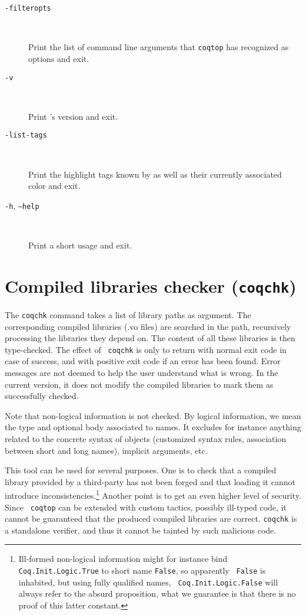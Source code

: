 \begin{description}
\item[{\tt -filteropts}]\ %

  Print the list of command line arguments that {\tt coqtop} has
  recognized as options and exit.

\item[{\tt -v}]\ %

  Print \Coq's version and exit.

\item[{\tt -list-tags}]\ %

  Print the highlight tags known by {\Coq} as well as their currently associated
  color and exit.

\item[{\tt -h}, {\tt --help}]\ %

  Print a short usage and exit.

\end{description}


\section{Compiled libraries checker ({\tt coqchk})}

The {\tt coqchk} command takes a list of library paths as argument.
The corresponding compiled libraries (.vo files) are searched in the
path, recursively processing the libraries they depend on. The content
of all these libraries is then type-checked. The effect of {\tt
  coqchk} is only to return with normal exit code in case of success,
and with positive exit code if an error has been found. Error messages
are not deemed to help the user understand what is wrong. In the
current version, it does not modify the compiled libraries to mark
them as successfully checked.

Note that non-logical information is not checked. By logical
information, we mean the type and optional body associated to names.
It excludes for instance anything related to the concrete syntax of
objects (customized syntax rules, association between short and long
names), implicit arguments, etc.

This tool can be used for several purposes. One is to check that a
compiled library provided by a third-party has not been forged and
that loading it cannot introduce inconsistencies.\footnote{Ill-formed
  non-logical information might for instance bind {\tt
    Coq.Init.Logic.True} to short name {\tt False}, so apparently {\tt
    False} is inhabited, but using fully qualified names, {\tt
    Coq.Init.Logic.False} will always refer to the absurd proposition,
  what we guarantee is that there is no proof of this latter
  constant.}
Another point is to get an even higher level of security. Since {\tt
  coqtop} can be extended with custom tactics, possibly ill-typed
code, it cannot be guaranteed that the produced compiled libraries are
correct. {\tt coqchk} is a standalone verifier, and thus it cannot be
tainted by such malicious code.

